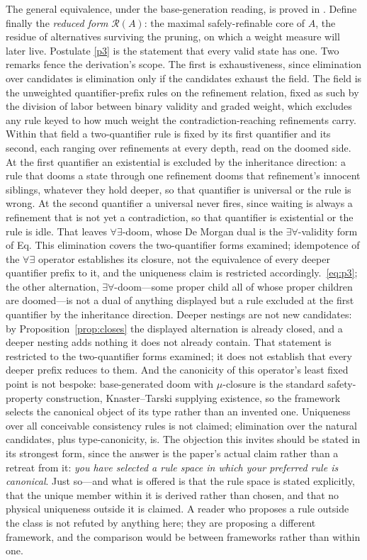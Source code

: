 The general equivalence, under the base-generation reading, is proved in \cite{Aethus}. Define finally the \emph{reduced form} $\mathcal{R}(A)$: the maximal safely-refinable core of $A$, the residue of alternatives surviving the pruning, on which a weight measure will later live. Postulate \ref{p3} is the statement that every valid state has one. Two remarks fence the derivation's scope. The first is exhaustiveness, since elimination over candidates is elimination only if the candidates exhaust the field. The field is the unweighted quantifier-prefix rules on the refinement relation, fixed as such by the division of labor between binary validity and graded weight, which excludes any rule keyed to how much weight the contradiction-reaching refinements carry. Within that field a two-quantifier rule is fixed by its first quantifier and its second, each ranging over refinements at every depth, read on the doomed side. At the first quantifier an existential is excluded by the inheritance direction: a rule that dooms a state through one refinement dooms that refinement's innocent siblings, whatever they hold deeper, so that quantifier is universal or the rule is wrong. At the second quantifier a universal never fires, since waiting is always a refinement that is not yet a contradiction, so that quantifier is existential or the rule is idle. That leaves $\forall\exists$-doom, whose De Morgan dual is the $\exists\forall$-validity form of Eq. This elimination covers the two-quantifier forms examined; idempotence of the $\forall\exists$ operator establishes its closure, not the equivalence of every deeper quantifier prefix to it, and the uniqueness claim is restricted accordingly.~\eqref{eq:p3}; the other alternation, $\exists\forall$-doom---some proper child all of whose proper children are doomed---is not a dual of anything displayed but a rule excluded at the first quantifier by the inheritance direction. Deeper nestings are not new candidates: by Proposition~\ref{prop:closes} the displayed alternation is already closed, and a deeper nesting adds nothing it does not already contain. That statement is restricted to the two-quantifier forms examined; it does not establish that every deeper prefix reduces to them. And the canonicity of this operator's least fixed point is not bespoke: base-generated doom with $\mu$-closure is the standard safety-property construction, Knaster--Tarski supplying existence, so the framework selects the canonical object of its type rather than an invented one. Uniqueness over all conceivable consistency rules is not claimed; elimination over the natural candidates, plus type-canonicity, is. The objection this invites should be stated in its strongest form, since the answer is the paper's actual claim rather than a retreat from it: \emph{you have selected a rule space in which your preferred rule is canonical}. Just so---and what is offered is that the rule space is stated explicitly, that the unique member within it is derived rather than chosen, and that no physical uniqueness outside it is claimed. A reader who proposes a rule outside the class is not refuted by anything here; they are proposing a different framework, and the comparison would be between frameworks rather than within one.

